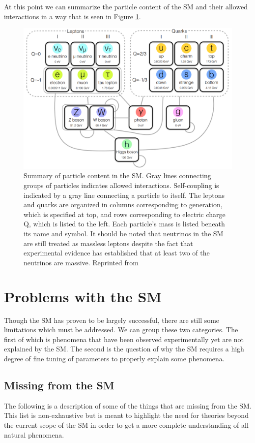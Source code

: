 At this point we can summarize the particle content of the SM and their allowed interactions in a way that is seen in Figure \ref{fig:smcontent}.

\begin{figure}[h]
	\centering
	\includegraphics[width=1.0\linewidth]{Figures/SMcontent}
	\caption[Summary of content of the SM.]{Summary of particle content in the SM. Gray lines connecting groups of particles indicates allowed interactions. Self-coupling is indicated by a gray line connecting a particle to itself. The leptons and quarks are organized in columns corresponding to generation, which is specified at top, and rows corresponding to electric charge Q, which is listed to the left. Each particle's mass is listed beneath its name and symbol. It should be noted that neutrinos in the SM are still treated as massless leptons despite the fact that experimental evidence has established that at least two of the neutrinos are massive. Reprinted from \cite{Iiyama:2015nem}}
	\label{fig:smcontent}
\end{figure}


\section{Problems with the SM}
Though the SM has proven to be largely successful, there are still some limitations which must be addressed.  We can group these two categories.  The first of which is phenomena that have been observed experimentally yet are not explained by the SM.  The second is the question of why the SM requires a high degree of fine tuning of parameters to properly explain some phenomena.

\subsection{Missing from the SM}
The following is a description of some of the things that are missing from the SM.  This list is non-exhaustive but is meant to highlight the need for theories beyond the current scope of the SM in order to get a more complete understanding of all natural phenomena.

